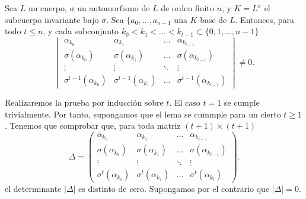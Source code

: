 \begin{lemma}
    Sea \(L\) un cuerpo, \(\sigma\) un automorfismo de \(L\) de orden finito \(n\), y \(K = L^\sigma\) el subcuerpo invariante bajo \(\sigma\). Sea  \(\{a_0, \dots, a_{n-1}\) una \(K\)-base de \(L\). Entonces, para todo \(t \leq n\), y cada subconjunto \(k_0 < k_1 < \dots < k_{t-1} \subset \{0, 1, \dots, n-1\}\)
    \[
    \begin{vmatrix}
        \alpha_{k_0} & \alpha_{k_1} & \dots & \alpha_{k_{t -1}} \\
        \sigma(\alpha_{k_0}) & \sigma(\alpha_{k_1}) & \dots & \sigma(\alpha_{k_{t-1}}) \\
        \vdots & \vdots & \ddots & \vdots \\
        \sigma^{t-1}(\alpha_{k_0}) & \sigma^{t-1}(\alpha_{k_1}) & \dots & \sigma^{t-1}(\alpha_{k_{t-1}})
    \end{vmatrix}
    \neq 0
    .\]
\end{lemma}

\begin{proofs}
    Realizaremos la prueba por inducción sobre \(t\). El caso \(t = 1\) se cumple trivialmente. Por tanto, supongamos que el lema se cummple para un cierto  \(t \geq 1\). Tenemos que comprobar que, para toda matriz \((t+1) \times (t+1)\)
    \[
    \Delta =
    \begin{pmatrix}
        \alpha_{k_0} & \alpha_{k_1} & \dots & \alpha_{k_{t -1}} \\
        \sigma(\alpha_{k_0}) & \sigma(\alpha_{k_1}) & \dots & \sigma(\alpha_{k_{t-1}}) \\
        \vdots & \vdots & \ddots & \vdots \\
        \sigma^{t}(\alpha_{k_0}) & \sigma^{t}(\alpha_{k_1}) & \dots & \sigma^{t}(\alpha_{k_{t}})

    \end{pmatrix}
    .\]
el determinante \(|\Delta|\) es distinto de cero. Supongamos por el contrario que \(|\Delta| = 0\).
\end{proofs}

